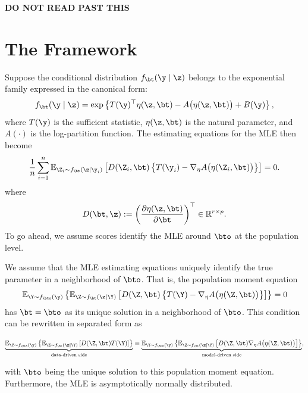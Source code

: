 \newpage



\vspace*{\fill}
\begin{center}
    {\Huge \bfseries DO NOT READ PAST THIS}
\end{center}
\vspace*{\fill}

\newpage







\section{The Framework}
Suppose the conditional distribution \( f_\bt(\y \mid \z) \) belongs to the exponential family expressed in the canonical form:
\[
f_\bt(\y \mid \z) = \exp\left\{ T(\y)^\top \eta(\z, \bt) - A\bigl(\eta(\z, \bt)\bigr) + B(\y) \right\},
\]
where \( T(\y) \) is the sufficient statistic, \( \eta(\z, \bt) \) is the natural parameter, and \( A(\cdot) \) is the log-partition function. The estimating equations for the MLE then become
\begin{equation}
\frac{1}{n} \sum_{i=1}^n 
\mathbb{E}_{\Z_i\sim f_\bt(\z|\y_i)} \left[
    D(\Z_i, \bt)\left\{ T(\y_i) - \nabla_\eta A\bigl( \eta(\Z_i, \bt) \bigr) \right\}
\right]
= 0.
\label{MLE-estimating-equations-expfam}
\end{equation}
where 
\[
D(\bt, \z) := \left( \frac{\partial \eta(\z, \bt)}{\partial \bt} \right)^\top \in \mathbb{R}^{r \times p}.
\]
%
To go ahead, we assume scores identify the MLE around $\bto$ at the population level.

\begin{assumption}
\label{ass:mle-identifiability}
We assume that the MLE estimating equations uniquely identify the true parameter in a neighborhood of $\bto$. That is, the population moment equation
\[
\mathbb{E}_{\Y \sim f_{\bto}(\y)}
\left\{
\mathbb{E}_{\Z \sim f_\bt(\z \mid \Y)}
\left[
    D(\Z, \bt)
    \left\{
        T(\Y) - \nabla_\eta A\bigl( \eta(\Z, \bt) \bigr)
    \right\}
\right]
\right\}
= 0
\]
has $\bt = \bto$ as its unique solution in a neighborhood of $\bto$. This condition can be rewritten in separated form as

\[
\underbrace{
\mathbb{E}_{\Y \sim f_{\bto}(\y)}
\left\{
\mathbb{E}_{\Z \sim f_{\bt}(\z \mid \Y)}
\left[
    D(\Z, \bt)
    T(\Y)
\right]
\right\}
}_{\text{data-driven side}}
=
\underbrace{
\mathbb{E}_{\Y \sim f_{\bto}(\y)}
\left\{
\mathbb{E}_{\Z \sim f_{\bt}(\z \mid \Y)}
\left[
    D(\Z, \bt)
    \nabla_\eta A\bigl(\eta(\Z, \bt)\bigr)
\right]
\right\}
}_{\text{model-driven side}},
\]

with $\bto$ being the unique solution to this population moment equation.
Furthermore, the MLE is asymptotically normally distributed.
\end{assumption}

